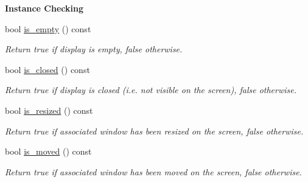 \begin{Indent}\textbf{ Instance Checking}\par
\begin{DoxyCompactItemize}
\item 
\mbox{\label{structcimg__library__suffixed_1_1CImgDisplay_ac16a92c12938405d33d489cb70a7ac06}} 
bool \hyperlink{structcimg__library__suffixed_1_1CImgDisplay_ac16a92c12938405d33d489cb70a7ac06}{is\+\_\+empty} () const
\begin{DoxyCompactList}\small\item\em Return {\ttfamily true} if display is empty, {\ttfamily false} otherwise. \end{DoxyCompactList}\item 
bool \hyperlink{structcimg__library__suffixed_1_1CImgDisplay_a6fa9d8294099dc9e1e6f67cc67e159c6}{is\+\_\+closed} () const
\begin{DoxyCompactList}\small\item\em Return {\ttfamily true} if display is closed (i.\+e. not visible on the screen), {\ttfamily false} otherwise. \end{DoxyCompactList}\item 
\mbox{\label{structcimg__library__suffixed_1_1CImgDisplay_a0dba5af2cd3044396cc706678cee4a00}} 
bool \hyperlink{structcimg__library__suffixed_1_1CImgDisplay_a0dba5af2cd3044396cc706678cee4a00}{is\+\_\+resized} () const
\begin{DoxyCompactList}\small\item\em Return {\ttfamily true} if associated window has been resized on the screen, {\ttfamily false} otherwise. \end{DoxyCompactList}\item 
\mbox{\label{structcimg__library__suffixed_1_1CImgDisplay_a481558a6e562b1945b266b35bd75b91c}} 
bool \hyperlink{structcimg__library__suffixed_1_1CImgDisplay_a481558a6e562b1945b266b35bd75b91c}{is\+\_\+moved} () const
\begin{DoxyCompactList}\small\item\em Return {\ttfamily true} if associated window has been moved on the screen, {\ttfamily false} otherwise. \end{DoxyCompactList}\item 
\mbox{\label{structcimg__library__suffixed_1_1CImgDisplay_ae4bae55b51a6049ea31ce908ff5d89c5}} 

\end{DoxyCompactItemize}
\end{Indent}
